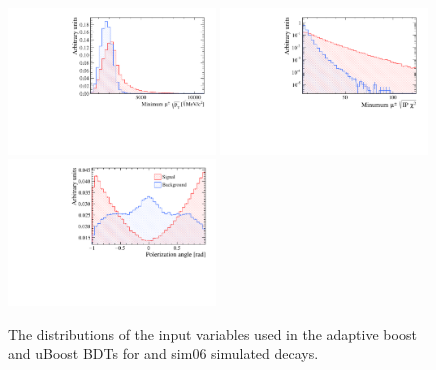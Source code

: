 \begin{figure}[htbp]
    \includegraphics[width=0.49\textwidth]{./Figs/Appendix2/min_mu_PT.pdf}
    \includegraphics[width=0.49\textwidth]{./Figs/Appendix2/min_mu_IP.pdf}
    \includegraphics[width=0.49\textwidth]{./Figs/Appendix2/polerization.pdf}
  \caption{The distributions of the input variables used in the adaptive boost and uBoost BDTs for \bsmumu and  sim06 simulated decays.}
  \label{fig:myBDTvars}
\end{figure}


